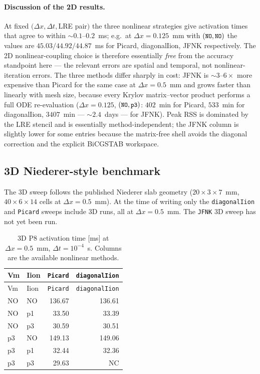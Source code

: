 \documentclass[11pt,a4paper]{article}
\newcommand{\code}[1]{\texttt{\small #1}}
\begin{document}
\paragraph{Discussion of the 2D results.}
At fixed $(\Delta x, \Delta t, $LRE pair$)$ the three nonlinear
strategies give activation times that agree to within $\sim 0.1$--$0.2$~ms;
e.g.\ at $\Delta x = 0.125$~mm with $(\code{NO}, \code{NO})$ the values
are $45.03/44.92/44.87$~ms for Picard, diagonalIion, JFNK respectively.
The 2D nonlinear-coupling choice is therefore essentially \emph{free}
from the accuracy standpoint here --- the relevant errors are spatial
and temporal, not nonlinear-iteration errors. The three methods differ
sharply in cost: JFNK is $\sim 3$--$6\times$ more expensive than
Picard for the same case at $\Delta x = 0.5$~mm and grows faster than
linearly with mesh size, because every Krylov matrix--vector product
performs a full ODE re-evaluation
($\Delta x = 0.125$, $(\code{NO},\code{p3})$: $402$~min for Picard,
$533$~min for diagonalIion, $3407$~min --- $\sim 2.4$~days --- for
JFNK). Peak RSS is dominated by the LRE stencil and is essentially
method-independent; the JFNK column is slightly lower for some entries
because the matrix-free shell avoids the diagonal correction and the
explicit BiCGSTAB workspace.

\subsection{3D Niederer-style benchmark}
\label{sec:results:3D}

The 3D sweep follows the published Niederer slab geometry
($20\times 3\times 7$~mm, $40\times 6\times 14$ cells at
$\Delta x = 0.5$~mm). At the time of writing only the
\code{diagonalIion} and \code{Picard} sweeps include 3D runs, all at
$\Delta x = 0.5$~mm. The \code{JFNK} 3D sweep has not yet been run.

\begin{center}\footnotesize
\begin{longtable}{llrr}
\caption{3D P8 activation time [ms] at $\Delta x = 0.5$~mm,
$\Delta t = 10^{-4}$~s. Columns are the available nonlinear methods.}\\
\toprule
Vm & Iion & \code{Picard} & \code{diagonalIion} \\
\midrule\endfirsthead\toprule
Vm & Iion & \code{Picard} & \code{diagonalIion} \\
\midrule\endhead
NO & NO & 136.67 & 136.61 \\
NO & p1 &  33.50 &  33.39 \\
NO & p3 &  30.59 &  30.51 \\
p3 & NO & 149.13 & 149.06 \\
p3 & p1 &  32.44 &  32.36 \\
p3 & p3 &  29.63 & NC     \\
\bottomrule\end{longtable}\end{center}
\end{document}
